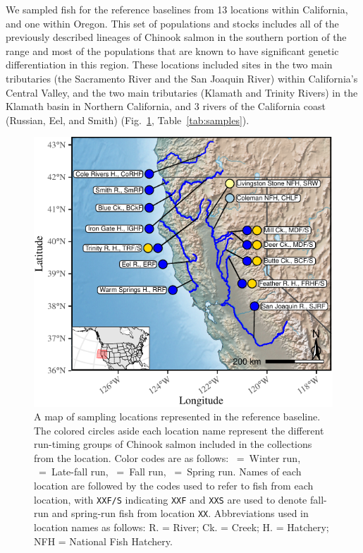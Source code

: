 We sampled fish for the reference baselines from 13 locations within California, and one 
within Oregon. This set of populations and stocks includes all of the previously described lineages of Chinook salmon in the southern portion of the range and most of the populations that are known to have significant genetic differentiation in this region. 
These locations included sites in the two
main tributaries (the Sacramento River and the San Joaquin River) within
California's Central Valley, and the two main tributaries (Klamath and Trinity Rivers) in the Klamath basin in Northern California, and
3 rivers of the California coast (Russian, Eel, and Smith)
(Fig.~\ref{fig:map}, Table~\ref{tab:samples}).
\begin{figure}
\newcommand{\mapcap}{\footnotesize  A map of sampling locations represented in the reference 
baseline.  The colored circles aside
each location name represent the different run-timing groups of Chinook salmon
included in the collections from the location.  Color codes are as follows: \Wball~=~Winter run,
\LFball{}~=~Late-fall run, \Fball~=~Fall run, \Sball~=~Spring run. 
Names of each location are followed by the codes used to refer to fish from each location, with
{\tt XXF/S} indicating {\tt XXF} and {\tt XXS} are used to denote fall-run and spring-run fish
from location {\tt XX}.  Abbreviations used in location names as follows: R. = River; Ck. = Creek; H. = Hatchery; NFH = National Fish Hatchery.}
\begin{center}
\includegraphics[width=\columnwidth]{images/map-crop.pdf}
\end{center}
\caption[\mapcap]{\mapcap}
\label{fig:map}
\end{figure}

